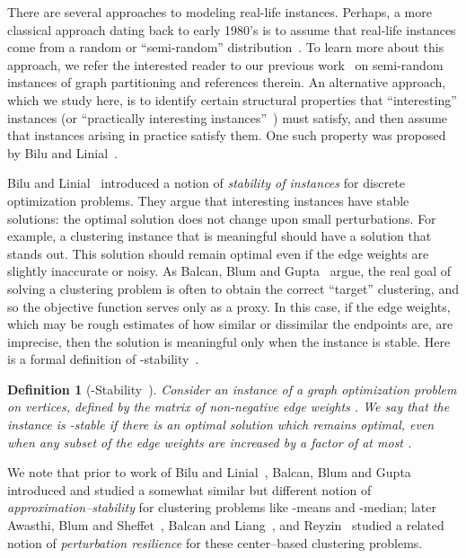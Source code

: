 \documentclass[twoside,leqno,twocolumn]{article}
\newtheorem{Definition}[theorem]{Definition}
\begin{document}
There are several approaches to modeling real-life instances. Perhaps, a more classical approach dating back
to early 1980's is to assume that real-life instances come from a random or ``semi-random'' distribution~\cite{BS,FKra,FK,KMM,MMV1,MMV2}. To learn more about this approach,
we refer the interested reader to our previous work~\cite{MMV1} on semi-random instances of graph partitioning and references therein.
An alternative approach, which we study here, is to identify certain structural properties that
``interesting'' instances (or ``practically interesting instances''~\cite{BDLS}) must satisfy, and then assume that instances arising in practice 
satisfy them. One such
property was proposed by Bilu and Linial~\cite{BL}.

Bilu and Linial~\cite{BL} introduced a notion of {\em stability of instances} for discrete optimization problems. They argue that interesting instances have stable solutions: the optimal solution does not change upon small perturbations. For example, a clustering instance that is meaningful should have a solution that stands out. This solution should remain optimal even if the edge weights are slightly inaccurate or noisy.
As Balcan, Blum and Gupta~\cite{BBG} argue, the real goal of solving a clustering problem is often to obtain the correct ``target''
clustering, and so the objective function serves only as a proxy. In this case, if the edge weights, which may be rough estimates of how similar or dissimilar the endpoints are, are imprecise, then the solution is meaningful only when the instance is stable. 
Here is a formal definition of -stability~\cite{BL}.

\begin{Definition}[-Stability~\cite{BL}]
Consider an instance of a graph optimization problem on  vertices, defined by the matrix of non-negative edge weights . We say that the instance is -stable if there is an optimal solution which remains optimal, even when any subset of the edge weights are increased by a factor of at most . 
\end{Definition} 

We note that prior to work of Bilu and Linial~\cite{BL}, Balcan, Blum and Gupta~\cite{BBG} introduced and studied a somewhat 
similar but different notion of \textit{approximation--stability} for clustering problems like -means and -median;
later Awasthi, Blum and Sheffet~\cite{Awasthietal}, Balcan and Liang~\cite{BalcanL}, and Reyzin~\cite{Rey} studied a related notion of \textit{perturbation resilience} for these center--based clustering problems.
 
\end{document}
